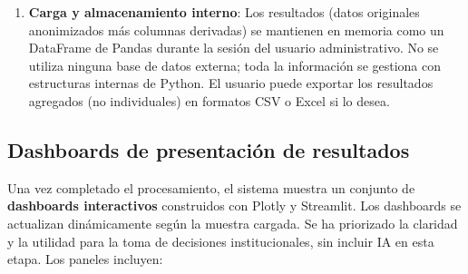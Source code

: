 \documentclass[12pt, spanish]{article}
\begin{document}
\begin{enumerate}
\begin{itemize}
            \item Por cada fila del DataFrame, se aplica el modelo matemático (secciones 4.2 a 4.6) y se calculan:
                \begin{itemize}
                    \item Fatiga cognitiva
                    \item Horas efectivas de estudio
                    \item Shadow-Score (numérico y categoría cualitativa)
                    \item Coste de oportunidad en horas
                    \item Coste de oportunidad en PPA (si se suministró promedio\_actual)
                \end{itemize}
            \item Se añaden estas columnas derivadas al DataFrame.
        \end{itemize}
    \item \textbf{Carga y almacenamiento interno}: Los resultados (datos originales anonimizados más columnas derivadas) se mantienen en memoria como un DataFrame de Pandas durante la sesión del usuario administrativo. No se utiliza ninguna base de datos externa; toda la información se gestiona con estructuras internas de Python. El usuario puede exportar los resultados agregados (no individuales) en formatos CSV o Excel si lo desea.
\end{enumerate}

\subsection{Dashboards de presentación de resultados}
Una vez completado el procesamiento, el sistema muestra un conjunto de \textbf{dashboards interactivos} construidos con Plotly y Streamlit. Los dashboards se actualizan dinámicamente según la muestra cargada. Se ha priorizado la claridad y la utilidad para la toma de decisiones institucionales, sin incluir IA en esta etapa. Los paneles incluyen:
\end{document}
